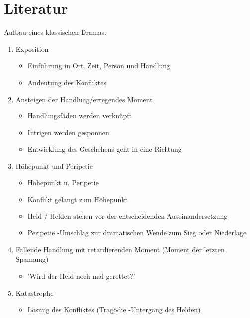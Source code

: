 \documentclass{article}
\begin{document}
\section{Literatur}
Aufbau eines klassischen Dramas:
\begin{enumerate}
  \item Exposition
  \begin{itemize}
    \item Einführung in Ort, Zeit, Person und Handlung
    \item Andeutung des Konfliktes
  \end{itemize}
  \item Ansteigen der Handlung/erregendes Moment
  \begin{itemize}
    \item Handlungsfäden werden verknüpft
    \item Intrigen werden gesponnen
    \item Entwicklung des Geschehens geht in eine Richtung
  \end{itemize}
  \item Höhepunkt und Peripetie
  \begin{itemize}
    \item Höhepunkt u. Peripetie
    \item Konflikt gelangt zum Höhepunkt
    \item Held / Helden stehen vor der entscheidenden Auseinandersetzung
    \item Peripetie -\guilsinglright Umschlag zur dramatischen Wende zum Sieg oder Niederlage
  \end{itemize}
  \item Fallende Handlung mit retardierenden Moment (Moment der letzten Spannung)
  \begin{itemize}
    \item 'Wird der Held noch mal gerettet?'
  \end{itemize}
  \item Katastrophe
  \begin{itemize}
    \item Lösung des Konfliktes (Tragödie -\guilsinglright Untergang des Helden)
  \end{itemize}
\end{enumerate}
\end{document}
